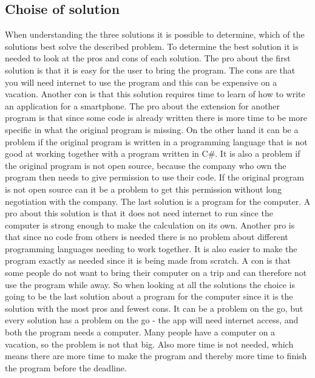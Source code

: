 \subsection{Choise of solution}
When understanding the three solutions it is possible to determine, which of the solutions best solve the described problem. To determine the best solution it is needed to look at the pros and cons of each solution. The pro about the first solution is that it is easy for the user to bring the program. The cons are that you will need internet to use the program and this can be expensive on a vacation. Another con is that this solution requires time to learn of how to write an application for a smartphone.
The pro about the extension for another program is that since some code is already written there is more time to be more specific in what the original program is missing. On the other hand it can be a problem if the original program is written in a programming language that is not good at working together with a program written in C\#. It is also a problem if the original program is not open source, because the company who own the program then needs to give permission to use their code. If the original program is not open source can it be a problem to get this permission without long negotiation with the company. The last solution is a program for the computer. A pro about this solution is that it does not need internet to run since the computer is strong enough to make the calculation on its own. Another pro is that since no code from others is needed there is no problem about different programming languages needing to work together. It is also easier to make the program exactly as needed since it is being made from scratch. A con is that some people do not want to bring their computer on a trip and can therefore not use the program while away. So when looking at all the solutions the choice is going to be the last solution about a program for the computer since it is the solution with the most pros and fewest cons. It can be a problem on the go, but every solution has a problem on the go - the app will need internet access, and both the program needs a computer. Many people have a computer on a vacation, so the problem is not that big. Also more time is not needed, which means there are more time to make the program and thereby more time to finish the program before the deadline.
